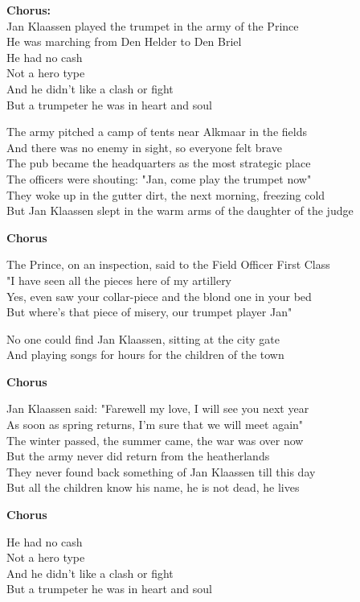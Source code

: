 \textbf{Chorus:}\\
Jan Klaassen played the trumpet in the army of the Prince\\
He was marching from Den Helder to Den Briel\\
He had no cash\\
Not a hero type\\
And he didn't like a clash or fight\\
But a trumpeter he was in heart and soul

The army pitched a camp of tents near Alkmaar in the fields\\
And there was no enemy in sight, so everyone felt brave\\
The pub became the headquarters as the most strategic place\\
The officers were shouting: "Jan, come play the trumpet now"\\
They woke up in the gutter dirt, the next morning, freezing cold\\
But Jan Klaassen slept in the warm arms of the daughter of the judge 

\textbf{Chorus}

The Prince, on an inspection, said to the Field Officer First Class\\
"I have seen all the pieces here of my artillery\\
Yes, even saw your collar-piece and the blond one in your bed\\
But where's that piece of misery, our trumpet player Jan"

No one could find Jan Klaassen, sitting at the city gate\\
And playing songs for hours for the children of the town 

\textbf{Chorus}

Jan Klaassen said: "Farewell my love, I will see you next year\\
As soon as spring returns, I'm sure that we will meet again"\\
The winter passed, the summer came, the war was over now\\
But the army never did return from the heatherlands\\
They never found back something of Jan Klaassen till this day\\
But all the children know his name, he is not dead, he lives 

\textbf{Chorus}

He had no cash\\
Not a hero type\\
And he didn't like a clash or fight\\
But a trumpeter he was in heart and soul